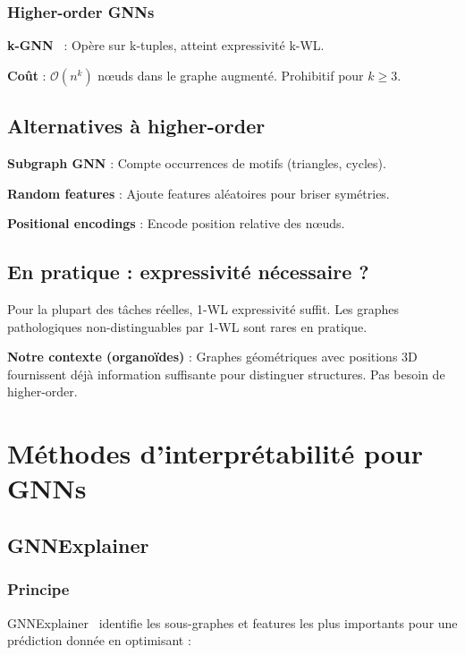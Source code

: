 \subsubsection{Higher-order GNNs}

\textbf{k-GNN}~\cite{Morris2019} : Opère sur k-tuples, atteint expressivité k-WL.

\textbf{Coût} : $\mathcal{O}(n^k)$ nœuds dans le graphe augmenté. Prohibitif pour $k \geq 3$.

\subsection{Alternatives à higher-order}

\textbf{Subgraph GNN} : Compte occurrences de motifs (triangles, cycles).

\textbf{Random features} : Ajoute features aléatoires pour briser symétries.

\textbf{Positional encodings} : Encode position relative des nœuds.

\subsection{En pratique : expressivité nécessaire ?}

Pour la plupart des tâches réelles, 1-WL expressivité suffit. Les graphes pathologiques non-distinguables par 1-WL sont rares en pratique.

\textbf{Notre contexte (organoïdes)} : Graphes géométriques avec positions 3D fournissent déjà information suffisante pour distinguer structures. Pas besoin de higher-order.

\section{Méthodes d'interprétabilité pour GNNs}

\subsection{GNNExplainer}

\subsubsection{Principe}

GNNExplainer~\cite{Ying2019} identifie les sous-graphes et features les plus importants pour une prédiction donnée en optimisant :

